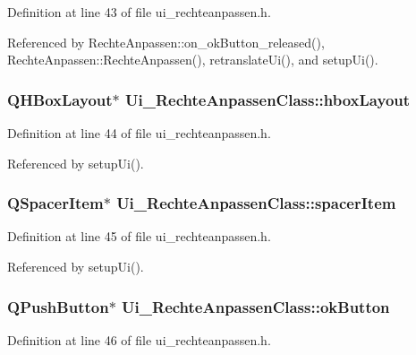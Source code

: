 Definition at line 43 of file ui\_\-rechteanpassen.h.

Referenced by RechteAnpassen::on\_\-okButton\_\-released(), RechteAnpassen::RechteAnpassen(), retranslateUi(), and setupUi().\hypertarget{class_ui___rechte_anpassen_class_3d6cb54f6b5ee6c8320b96f795226af8}{
\subsubsection[hboxLayout]{\setlength{\rightskip}{0pt plus 5cm}QHBoxLayout$\ast$ {\bf Ui\_\-RechteAnpassenClass::hboxLayout}}}
\label{class_ui___rechte_anpassen_class_3d6cb54f6b5ee6c8320b96f795226af8}




Definition at line 44 of file ui\_\-rechteanpassen.h.

Referenced by setupUi().\hypertarget{class_ui___rechte_anpassen_class_bd09460344a75273bfa55e563d438f97}{
\subsubsection[spacerItem]{\setlength{\rightskip}{0pt plus 5cm}QSpacerItem$\ast$ {\bf Ui\_\-RechteAnpassenClass::spacerItem}}}
\label{class_ui___rechte_anpassen_class_bd09460344a75273bfa55e563d438f97}




Definition at line 45 of file ui\_\-rechteanpassen.h.

Referenced by setupUi().\hypertarget{class_ui___rechte_anpassen_class_d297abb0cb0bd135a1c7da1cefcee037}{
\subsubsection[okButton]{\setlength{\rightskip}{0pt plus 5cm}QPushButton$\ast$ {\bf Ui\_\-RechteAnpassenClass::okButton}}}
\label{class_ui___rechte_anpassen_class_d297abb0cb0bd135a1c7da1cefcee037}




Definition at line 46 of file ui\_\-rechteanpassen.h.

